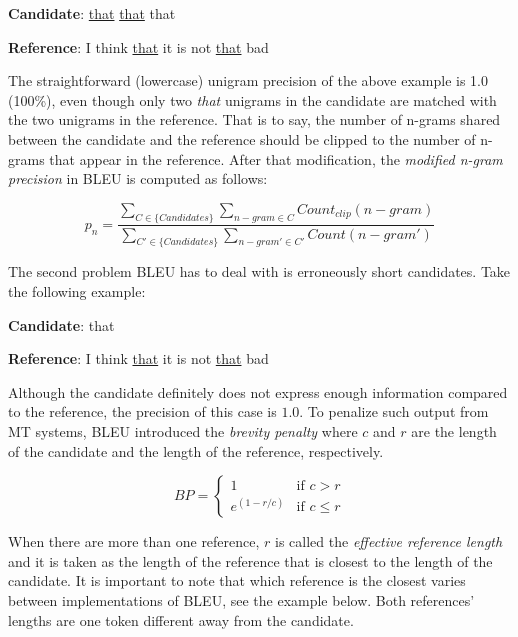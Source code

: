 \bigskip

\textbf{Candidate}: \underline{that} \underline{that} that

\textbf{Reference}: I think \underline{that} it is not \underline{that} bad

\bigskip

The straightforward (lowercase) unigram precision of the above example is 1.0 (100\%), even though only two \textit{that} unigrams in the candidate are matched with the two unigrams in the reference.
That is to say, the number of n-grams shared between the candidate and the reference should be clipped to the number of n-grams that appear in the reference.
After that modification, the \textit{modified n-gram precision} in BLEU is computed as follows:

\begin{equation}
    p_n=\frac{\sum_{C\in\{Candidates\}}\sum_{n-gram\in C}Count_{clip}(n-gram)}{\sum_{C'\in\{Candidates\}}\sum_{n-gram'\in C'}Count(n-gram')}
\end{equation}

The second problem BLEU has to deal with is erroneously short candidates.
Take the following example:

\bigskip

\textbf{Candidate}: that

\textbf{Reference}: I think \underline{that} it is not \underline{that} bad

\bigskip

Although the candidate definitely does not express enough information compared to the reference, the precision of this case is $1.0$.
To penalize such output from MT systems, BLEU introduced the \textit{brevity penalty} where $c$ and $r$ are the length of the candidate and the length of the reference, respectively.

\begin{equation}
    BP=\begin{cases} 1 & \mbox{if } c>r \\ e^{(1-r/c)} & \mbox{if } c\le r \end{cases}
\end{equation}

When there are more than one reference, $r$ is called the \textit{effective reference length} and it is taken as the length of the reference that is closest to the length of the candidate.
It is important to note that which reference is the closest varies between implementations of BLEU, see the example below. Both references' lengths are one token different away from the candidate.


